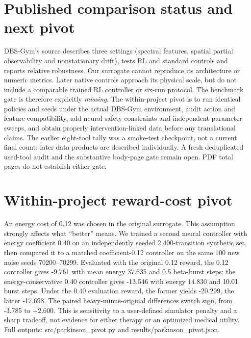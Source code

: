\section{Published comparison status and next pivot}
DBS-Gym's source describes three settings (spectral features, spatial partial observability and nonstationary drift), tests RL and standard controls and reports relative robustness. Our surrogate cannot reproduce its architecture or numeric metrics. Later native controls approach its physical scale, but do not include a comparable trained RL controller or six-run protocol. The benchmark gate is therefore explicitly \emph{missing}. The within-project pivot is to run identical policies and seeds under the actual DBS-Gym environment, audit action and feature compatibility, add neural safety constraints and independent parameter sweeps, and obtain properly intervention-linked data before any translational claims. The earlier eight-tool tally was a smoke-test checkpoint, not a current final count; later data products are described individually. A fresh deduplicated used-tool audit and the substantive body-page gate remain open. PDF total pages do not establish either gate.
\section{Within-project reward-cost pivot}
An energy cost of 0.12 was chosen in the original surrogate. This assumption strongly affects what ``better'' means. We trained a second neural controller with energy coefficient 0.40 on an independently seeded 2,400-transition synthetic set, then compared it to a matched coefficient-0.12 controller on the same 100 new noise seeds 70200--70299. Evaluated with the original 0.12 reward, the 0.12 controller gives -9.761 with mean energy 37.635 and 0.5 beta-burst steps; the energy-conservative 0.40 controller gives -13.546 with energy 14.830 and 10.01 burst steps. Under the 0.40 evaluation reward, the former yields -20.299, the latter -17.698. The paired heavy-minus-original differences switch sign, from -3.785 to +2.600. This is sensitivity to a user-defined simulator penalty and a sharp tradeoff, not evidence for either therapy or an optimized medical utility. Full outputs: src/parkinson\_pivot.py and results/parkinson\_pivot.json.

